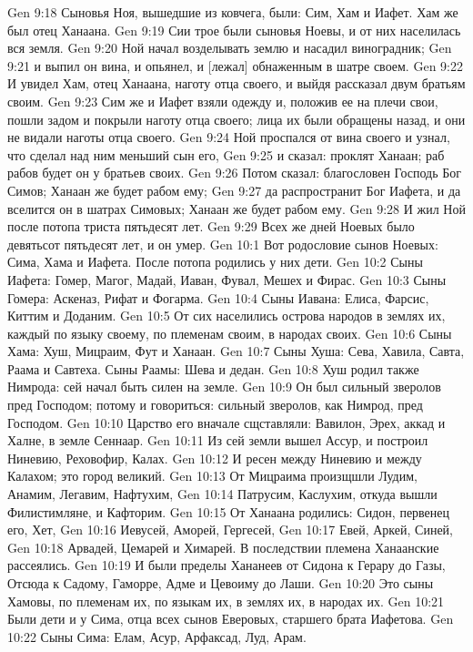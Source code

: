 Gen 9:18  Сыновья Ноя, вышедшие из ковчега, были: Сим, Хам и Иафет. Хам же был отец Ханаана.
Gen 9:19  Сии трое были сыновья Ноевы, и от них населилась вся земля.
Gen 9:20  Ной начал возделывать землю и насадил виноградник;
Gen 9:21  и выпил он вина, и опьянел, и [лежал] обнаженным в шатре своем.
Gen 9:22  И увидел Хам, отец Ханаана, наготу отца своего, и выйдя рассказал двум братьям своим.
Gen 9:23  Сим же и Иафет взяли одежду и, положив ее на плечи свои, пошли задом и покрыли наготу отца своего; лица их были обращены назад, и они не видали наготы отца своего.
Gen 9:24  Ной проспался от вина своего и узнал, что сделал над ним меньший сын его,
Gen 9:25  и сказал: проклят Ханаан; раб рабов будет он у братьев своих.
Gen 9:26  Потом сказал: благословен Господь Бог Симов; Ханаан же будет рабом ему;
Gen 9:27  да распространит Бог Иафета, и да вселится он в шатрах Симовых; Ханаан же будет рабом ему.
Gen 9:28  И жил Ной после потопа триста пятьдесят лет.
Gen 9:29  Всех же дней Ноевых было девятьсот пятьдесят лет, и он умер.
Gen 10:1  Вот родословие сынов Ноевых: Сима, Хама и Иафета. После потопа родились у них дети.
Gen 10:2  Сыны Иафета: Гомер, Магог, Мадай, Иаван, Фувал, Мешех и Фирас.
Gen 10:3  Сыны Гомера: Аскеназ, Рифат и Фогарма.
Gen 10:4  Сыны Иавана: Елиса, Фарсис, Киттим и Доданим.
Gen 10:5  От сих населились острова народов в землях их, каждый по языку своему, по племенам своим, в народах своих.
Gen 10:6  Сыны Хама: Хуш, Мицраим, Фут и Ханаан.
Gen 10:7  Сыны Хуша: Сева, Хавила, Савта, Раама и Савтеха. Сыны Раамы: Шева и дедан.
Gen 10:8  Хуш родил также Нимрода: сей начал быть силен на земле.
Gen 10:9  Он был сильный зверолов пред Господом; потому и говориться: сильный зверолов, как Нимрод, пред Господом.
Gen 10:10  Царство его вначале сщставляли: Вавилон, Эрех, аккад и Халне, в земле Сеннаар.
Gen 10:11  Из сей земли вышел Ассур, и построил Ниневию, Реховофир, Калах.
Gen 10:12  И ресен между Ниневию и между Калахом; это город великий.
Gen 10:13  От Мицраима произщшли Лудим, Анамим, Легавим, Нафтухим,
Gen 10:14  Патрусим, Каслухим, откуда вышли Филистимляне, и Кафторим.
Gen 10:15  От Ханаана родились: Сидон, первенец его, Хет,
Gen 10:16  Иевусей, Аморей, Гергесей,
Gen 10:17  Евей, Аркей, Синей,
Gen 10:18  Арвадей, Цемарей и Химарей. В последствии племена Ханаанские рассеялись.
Gen 10:19  И были пределы Хананеев от Сидона к Герару до Газы, Отсюда к Садому, Гаморре, Адме и Цевоиму до Лаши.
Gen 10:20  Это сыны Хамовы, по племенам их, по языкам их, в землях их, в народах их.
Gen 10:21  Были дети и у Сима, отца всех сынов Еверовых, старшего брата Иафетова.
Gen 10:22  Сыны Сима: Елам, Асур, Арфаксад, Луд, Арам.

